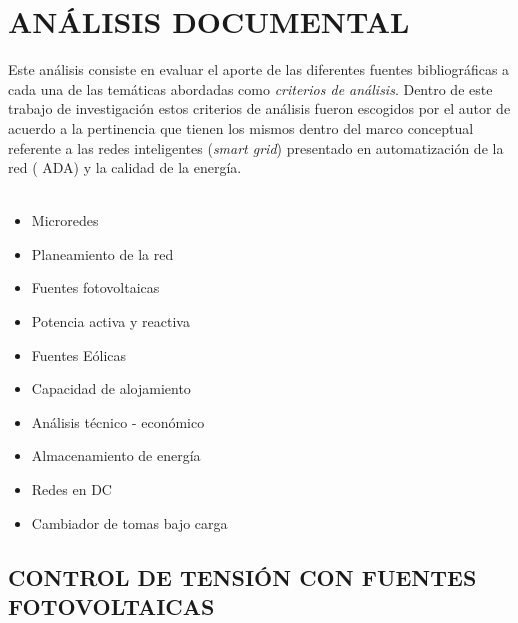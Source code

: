 \documentclass[12pt, letterpaper]{report}
\begin{document}

\chapter{ANÁLISIS DOCUMENTAL}
\label{cap:documental}

Este  análisis  consiste en evaluar el aporte de las diferentes fuentes bibliográficas a cada una de las temáticas abordadas  como \textit{criterios de análisis}. Dentro de este trabajo de investigación estos criterios de análisis fueron escogidos por el autor de acuerdo a la pertinencia que tienen los mismos dentro del marco conceptual referente a las redes inteligentes (\textit{smart grid}) presentado en   automatización de la red ( \ac{ADA}) y la calidad de la energía.\\\\ 

\begin{itemize}
    \item Microredes
    \item Planeamiento de la red
    \item Fuentes fotovoltaicas
    \item Potencia activa y reactiva
    \item Fuentes Eólicas
    \item Capacidad de alojamiento
    \item Análisis técnico - económico
    \item Almacenamiento de energía
    \item Redes en DC
    \item Cambiador de tomas bajo carga
\end{itemize}

\section{CONTROL DE TENSIÓN CON FUENTES FOTOVOLTAICAS}
\end{document}

